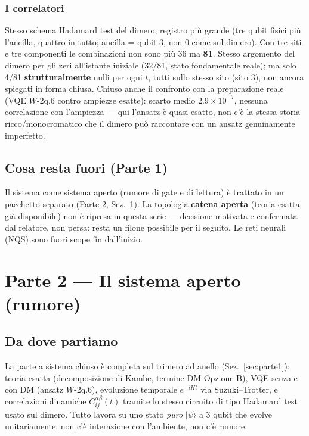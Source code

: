 \documentclass[11pt,a4paper]{article}
\newcommand{\ket}[1]{\lvert #1 \rangle}
\begin{document}
\subsubsection{I correlatori}

Stesso schema Hadamard test del dimero, registro più grande (tre qubit
fisici più l'ancilla, quattro in tutto; ancilla = qubit 3, non 0 come
sul dimero). Con tre siti e tre componenti le combinazioni non sono più
36 ma \textbf{81}. Stesso argomento del dimero per gli zeri all'istante
iniziale (32/81, stato fondamentale reale); ma solo 4/81
\textbf{strutturalmente} nulli per ogni $t$, tutti sullo stesso sito
(sito 3), non ancora spiegati in forma chiusa. Chiuso anche il
confronto con la preparazione reale (VQE $W$-2q.6 contro ampiezze
esatte): scarto medio $2.9\times10^{-7}$, nessuna correlazione con
l'ampiezza --- qui l'ansatz è quasi esatto, non c'è la stessa storia
ricco/monocromatico che il dimero può raccontare con un ansatz
genuinamente imperfetto.

\subsection{Cosa resta fuori (Parte 1)}

Il sistema come sistema aperto (rumore di gate e di lettura) è trattato
in un pacchetto separato (Parte 2, Sez.~\ref{sec:parte2}). La topologia
\textbf{catena aperta} (teoria esatta già disponibile) non è ripresa in
questa serie --- decisione motivata e confermata dal relatore, non persa:
resta un filone possibile per il seguito. Le reti neurali (NQS) sono
fuori scope fin dall'inizio.

\clearpage
\section{Parte 2 --- Il sistema aperto (rumore)}
\label{sec:parte2}

\subsection{Da dove partiamo}

La parte a sistema chiuso è completa sul trimero ad anello
(Sez.~\ref{sec:parte1}): teoria esatta (decomposizione di Kambe, termine
DM Opzione B), VQE senza e con DM (ansatz $W$-2q.6), evoluzione
temporale $e^{-iHt}$ via Suzuki--Trotter, e correlazioni dinamiche
$C_{ij}^{\alpha\beta}(t)$ tramite lo stesso circuito di tipo Hadamard
test usato sul dimero. Tutto lavora su uno stato \emph{puro} $\ket{\psi}$
a 3 qubit che evolve unitariamente: non c'è interazione con l'ambiente,
non c'è rumore.
\end{document}
